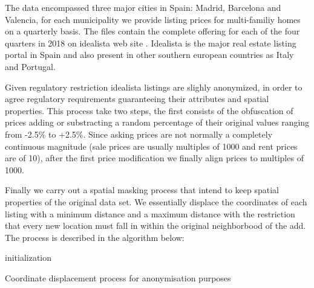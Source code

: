 \documentclass[times,final]{elsarticle}
\begin{document}
The data encompassed three major cities in Spain: Madrid, Barcelona and Valencia, for each municipality we provide listing prices for multi-familiy homes on a quarterly basis. The files contain the complete offering for each of the four quarters in 2018 on idealista web site \cite{idealista}. Idealista is the major real estate listing portal in Spain and also present in other southern european countries as Italy and Portugal.

Given regulatory restriction idealista listings are slighly anonymized, in order to agree regulatory requirements guaranteeing their attributes and spatial properties. This process take two steps, the first consists of the obfuscation of prices adding or substracting a random percentage of their original values ranging from -2.5\% to +2.5\%. Since asking prices are not normally a completely continuous magnitude (sale prices are usually multiples of 1000 and rent prices are of 10), after the first price modification we finally align prices to multiples of 1000.


Finally we carry out a spatial masking process that intend to keep spatial properties of the original data set. We essentially displace the coordinates of each listing with a minimum distance and a maximum distance with the restriction that every new location must fall in within the original neighborbood of the add. The process is described in the algorithm below:

\begin{algorithm}[H]
 initialization\;
 \caption{Coordinate displacement process for anonymisation purposes}
\end{algorithm}
\end{document}
